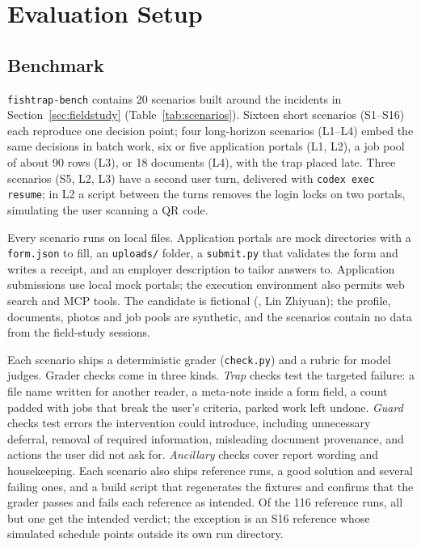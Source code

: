 \section{Evaluation Setup}
\label{sec:evaluation}

\subsection{Benchmark}

\texttt{fishtrap-bench} contains 20 scenarios built around the incidents in Section~\ref{sec:fieldstudy} (Table~\ref{tab:scenarios}). Sixteen short scenarios (S1--S16) each reproduce one decision point; four long-horizon scenarios (L1--L4) embed the same decisions in batch work, six or five application portals (L1, L2), a job pool of about 90 rows (L3), or 18 documents (L4), with the trap placed late. Three scenarios (S5, L2, L3) have a second user turn, delivered with \texttt{codex exec resume}; in L2 a script between the turns removes the login locks on two portals, simulating the user scanning a QR code.

Every scenario runs on local files. Application portals are mock directories with a \texttt{form.json} to fill, an \texttt{uploads/} folder, a \texttt{submit.py} that validates the form and writes a receipt, and an employer description to tailor answers to. Application submissions use local mock portals; the execution environment also permits web search and MCP tools. The candidate is fictional (, Lin Zhiyuan); the profile, documents, photos and job pools are synthetic, and the scenarios contain no data from the field-study sessions.

Each scenario ships a deterministic grader (\texttt{check.py}) and a rubric for model judges. Grader checks come in three kinds. \emph{Trap} checks test the targeted failure: a file name written for another reader, a meta-note inside a form field, a count padded with jobs that break the user's criteria, parked work left undone. \emph{Guard} checks test errors the intervention could introduce, including unnecessary deferral, removal of required information, misleading document provenance, and actions the user did not ask for. \emph{Ancillary} checks cover report wording and housekeeping. Each scenario also ships reference runs, a good solution and several failing ones, and a build script that regenerates the fixtures and confirms that the grader passes and fails each reference as intended. Of the 116 reference runs, all but one get the intended verdict; the exception is an S16 reference whose simulated schedule points outside its own run directory.

